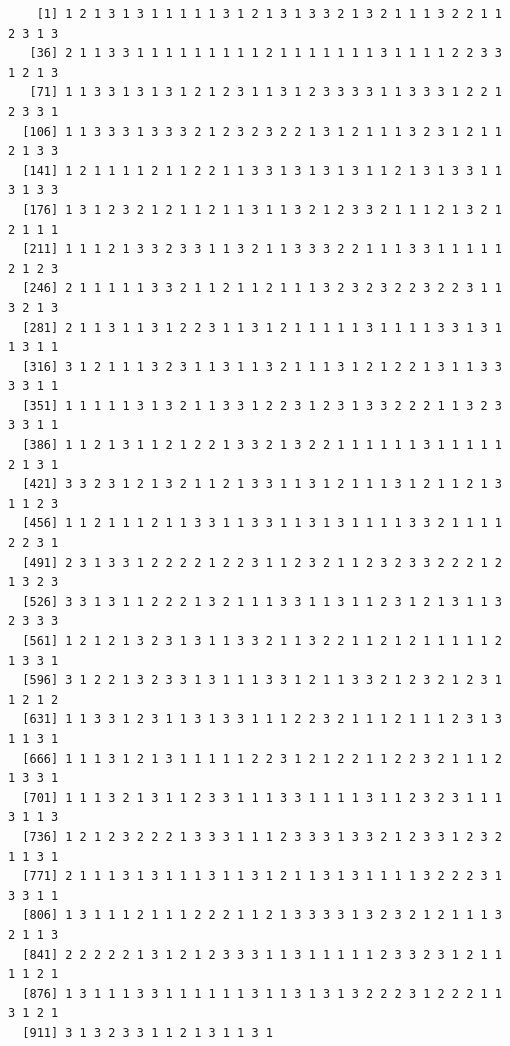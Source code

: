 \documentclass[12pt,twoside]{amherstthesis}
\begin{document}
  \begin{verbatim}
    [1] 1 2 1 3 1 3 1 1 1 1 1 3 1 2 1 3 1 3 3 2 1 3 2 1 1 1 3 2 2 1 1 2 3 1 3
   [36] 2 1 1 3 3 1 1 1 1 1 1 1 1 1 2 1 1 1 1 1 1 1 3 1 1 1 1 2 2 3 3 1 2 1 3
   [71] 1 1 3 3 1 3 1 3 1 2 1 2 3 1 1 3 1 2 3 3 3 3 1 1 3 3 3 1 2 2 1 2 3 3 1
  [106] 1 1 3 3 3 1 3 3 3 2 1 2 3 2 3 2 2 1 3 1 2 1 1 1 3 2 3 1 2 1 1 2 1 3 3
  [141] 1 2 1 1 1 1 2 1 1 2 2 1 1 3 3 1 3 1 3 1 3 1 1 2 1 3 1 3 3 1 1 3 1 3 3
  [176] 1 3 1 2 3 2 1 2 1 1 2 1 1 3 1 1 3 2 1 2 3 3 2 1 1 1 2 1 3 2 1 2 1 1 1
  [211] 1 1 1 2 1 3 3 2 3 3 1 1 3 2 1 1 3 3 3 2 2 1 1 1 3 3 1 1 1 1 1 2 1 2 3
  [246] 2 1 1 1 1 1 3 3 2 1 1 2 1 1 2 1 1 1 3 2 3 2 3 2 2 3 2 2 3 1 1 3 2 1 3
  [281] 2 1 1 3 1 1 3 1 2 2 3 1 1 3 1 2 1 1 1 1 1 3 1 1 1 1 3 3 1 3 1 1 3 1 1
  [316] 3 1 2 1 1 1 3 2 3 1 1 3 1 1 3 2 1 1 1 3 1 2 1 2 2 1 3 1 1 3 3 3 3 1 1
  [351] 1 1 1 1 1 3 1 3 2 1 1 3 3 1 2 2 3 1 2 3 1 3 3 2 2 2 1 1 3 2 3 3 3 1 1
  [386] 1 1 2 1 3 1 1 2 1 2 2 1 3 3 2 1 3 2 2 1 1 1 1 1 1 3 1 1 1 1 1 2 1 3 1
  [421] 3 3 2 3 1 2 1 3 2 1 1 2 1 3 3 1 1 3 1 2 1 1 1 3 1 2 1 1 2 1 3 1 1 2 3
  [456] 1 1 2 1 1 1 2 1 1 3 3 1 1 3 3 1 1 3 1 3 1 1 1 1 3 3 2 1 1 1 1 2 2 3 1
  [491] 2 3 1 3 3 1 2 2 2 2 1 2 2 3 1 1 2 3 2 1 1 2 3 2 3 3 2 2 2 1 2 1 3 2 3
  [526] 3 3 1 3 1 1 2 2 2 1 3 2 1 1 1 3 3 1 1 3 1 1 2 3 1 2 1 3 1 1 3 2 3 3 3
  [561] 1 2 1 2 1 3 2 3 1 3 1 1 3 3 2 1 1 3 2 2 1 1 2 1 2 1 1 1 1 1 2 1 3 3 1
  [596] 3 1 2 2 1 3 2 3 3 1 3 1 1 1 3 3 1 2 1 1 3 3 2 1 2 3 2 1 2 3 1 1 2 1 2
  [631] 1 1 3 3 1 2 3 1 1 3 1 3 3 1 1 1 2 2 3 2 1 1 1 2 1 1 1 2 3 1 3 1 1 3 1
  [666] 1 1 1 3 1 2 1 3 1 1 1 1 1 2 2 3 1 2 1 2 2 1 1 2 2 3 2 1 1 1 2 1 3 3 1
  [701] 1 1 1 3 2 1 3 1 1 2 3 3 1 1 1 3 3 1 1 1 1 3 1 1 2 3 2 3 1 1 1 3 1 1 3
  [736] 1 2 1 2 3 2 2 2 1 3 3 3 1 1 1 2 3 3 3 1 3 3 2 1 2 3 3 1 2 3 2 1 1 3 1
  [771] 2 1 1 1 3 1 3 1 1 1 3 1 1 3 1 2 1 1 3 1 3 1 1 1 1 3 2 2 2 3 1 3 3 1 1
  [806] 1 3 1 1 1 2 1 1 1 2 2 2 1 1 2 1 3 3 3 3 1 3 2 3 2 1 2 1 1 1 3 2 1 1 3
  [841] 2 2 2 2 2 1 3 1 2 1 2 3 3 3 1 1 3 1 1 1 1 1 2 3 3 2 3 1 2 1 1 1 1 2 1
  [876] 1 3 1 1 1 3 3 1 1 1 1 1 1 3 1 1 3 1 3 1 3 2 2 2 3 1 2 2 2 1 1 3 1 2 1
  [911] 3 1 3 2 3 3 1 1 2 1 3 1 1 3 1
  \end{verbatim}
  
  \begin{Shaded}
  \begin{Highlighting}[]
  \OperatorTok{$}
  \end{Highlighting}
  \end{Shaded}
  
\end{document}
